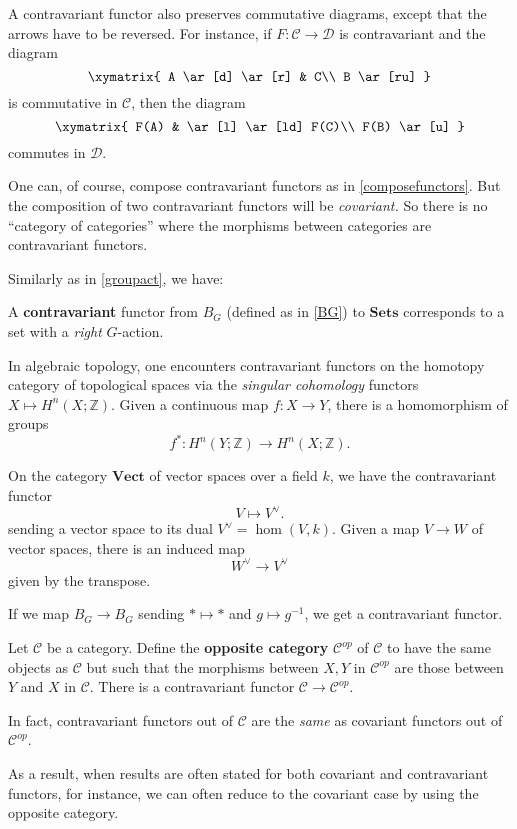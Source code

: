 A contravariant functor also preserves commutative diagrams, except that the
arrows have to be reversed. For instance, if $F: \mathcal{C} \to \mathcal{D}$
is contravariant and the diagram
\[ \xymatrix{
A \ar[d] \ar[r] &  C\\
B \ar[ru]
}\]
is commutative in $\mathcal{C}$, then the diagram
\[ \xymatrix{
F(A)   & \ar[l] \ar[ld] F(C)\\
F(B) \ar[u]
}\]
commutes in $\mathcal{D}$.

One can, of course, compose contravariant functors as in \cref{composefunctors}. But the composition of two
contravariant functors will be \emph{covariant.} So there is no ``category of
categories'' where the morphisms between categories are contravariant functors. 

Similarly as in \cref{groupact}, we have:

\begin{example}
A \textbf{contravariant} functor from $B_G$ (defined as in \cref{BG}) to $\mathbf{Sets}$ corresponds to a
set with a \emph{right} $G$-action.
\end{example}

\begin{example}
In algebraic topology, one encounters contravariant functors on the homotopy
category of topological spaces via the \emph{singular cohomology} functors $X
\mapsto H^n(X; \mathbb{Z})$. Given a continuous map $f: X \to Y$, there is a
homomorphism of groups
\[ f^* : H^n(Y; \mathbb{Z}) \to H^n(X; \mathbb{Z}).  \]
\end{example} 

\begin{example} \label{dualspace}
On the category $\mathbf{Vect}$ of vector spaces over a field $k$, we
have
the contravariant functor
\[ V \mapsto V^{\vee}.  \]
sending a vector space to its dual $V^{\vee} = \hom(V,k)$.
Given a map $V \to W$ of vector spaces, there is an induced map
\[ W^{\vee} \to V^{\vee}  \]
given by the transpose.
\end{example}

\begin{example}
If we map $B_G \to B_G$ sending $\ast \mapsto \ast$ and $g \mapsto g^{-1}$, we
get a
contravariant functor.
\end{example}

\begin{example} \label{oppositecategory}
Let $\mathcal{C}$ be a category. Define the \textbf{opposite category}
$\mathcal{C}^{op}$ of $\mathcal{C}$ to have the same objects as
$\mathcal{C}$  but such that the morphisms between $X,Y$ in
$\mathcal{C}^{op}$
are those between $Y$ and $X$ in $\mathcal{C}$.
There is a contravariant functor $\mathcal{C} \to
\mathcal{C}^{op}$.

In fact, contravariant functors out of $\mathcal{C}$ are the \emph{same} as
covariant functors out of $\mathcal{C}^{op}$.

As a result, when results are often stated for both covariant and contravariant
functors, for instance, we can often reduce to the covariant case by using the
opposite category.
\end{example}

